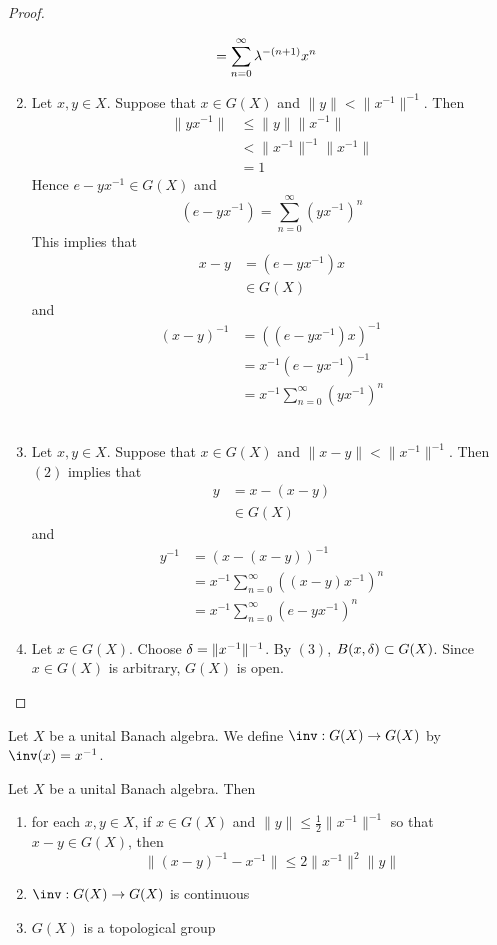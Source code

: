 \documentclass{book}
\begin{document}
\begin{proof}
\begin{enumerate}
\begin{align*}
			& = \sum_{n=0}^{\infty} \lambda^{-(n+1)} x^n 
		\end{align*}
		\item  Let $x, y \in X$. Suppose that $x \in G(X)$ and $\|y \|< \|x^{-1} \|^{-1}$. Then 
		\begin{align*}
			\|yx^{-1} \|
			& \leq \|y\| \|x^{-1} \| \\
			& <  \|x^{-1} \|^{-1} \|x^{-1} \| \\
			& = 1
		\end{align*}
		Hence $e - yx^{-1} \in G(X)$ and
		$$(e - yx^{-1}) = \sum_{n=0}^{\infty} (y x^{-1})^n$$
		This implies that 
		\begin{align*}
			x - y
			& = (e - yx^{-1}) x \\
			& \in G(X)
		\end{align*}
		and 
		\begin{align*}
			(x - y)^{-1}
			& = ((e - yx^{-1}) x)^{-1} \\
			& = x^{-1} (e - yx^{-1})^{-1} \\
			& = x^{-1} \sum_{n=0}^{\infty} (y x^{-1})^n
		\end{align*}
		\vspace{.5cm}\\
		\item Let $x, y \in X$. Suppose that $x \in G(X)$ and $\|x-y \|< \|x^{-1} \|^{-1}$. Then $(2)$ implies that 
		\begin{align*}
			y 
			& = x - (x -y) \\
			& \in G(X)
		\end{align*}
		and 
		\begin{align*}
			y^{-1} 
			& = (x - (x -y))^{-1} \\
			& = x^{-1} \sum_{n=0}^{\infty} ((x - y) x^{-1})^n \\
			& = x^{-1} \sum_{n=0}^{\infty} (e - y x^{-1})^n
		\end{align*}
		\item Let $x \in G(X)$. Choose $\delta = \|x^{-1}\|^{-1}$. By $(3)$, $B(x, \delta) \subset G(X)$. Since $x \in G(X)$ is arbitrary, $G(X)$ is open. 
	\end{enumerate}
\end{proof}	

\begin{defn}
	Let $X$ be a unital Banach algebra. We define $\inv: G(X) \rightarrow G(X)$ by $\inv(x) = x^{-1}$. 
\end{defn}

\begin{ex}
	Let $X$ be a unital Banach algebra. Then
	\begin{enumerate}
		\item for each $x,y \in X$, if $x \in G(X)$ and $\|y\| \leq \frac{1}{2} \|x^{-1}\|^{-1}$ so that $x - y \in G(X)$, then  
		$$\|(x-y)^{-1} - x^{-1}\| \leq 2 \|x^{-1}\|^2 \|y\|$$
		\item $\inv: G(X) \rightarrow G(X)$ is continuous
		\item $G(X)$ is a topological group
	\end{enumerate}
\end{ex}
\end{document}
